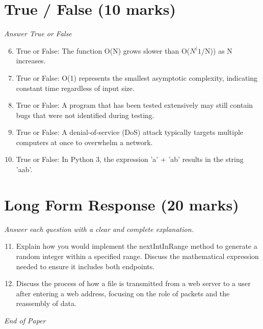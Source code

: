 \documentclass[12pt]{article}
\begin{document}
\section*{True / False (10 marks)}
\textit{Answer True or False}
\begin{enumerate}[label=\arabic*.]
\setcounter{enumi}{5}
\item True or False: The function O(N) grows slower than O($N^(1$/N)) as N increases.
\item True or False: O(1) represents the smallest asymptotic complexity, indicating constant time regardless of input size.
\item True or False: A program that has been tested extensively may still contain bugs that were not identified during testing.
\item True or False: A denial-of-service (DoS) attack typically targets multiple computers at once to overwhelm a network.
\item True or False: In Python 3, the expression 'a' + 'ab' results in the string 'aab'.
\end{enumerate}

\section*{Long Form Response (20 marks)}
\textit{Answer each question with a clear and complete explanation.}
\begin{enumerate}[label=\arabic*.]
\setcounter{enumi}{10}
\item Explain how you would implement the nextIntInRange method to generate a random integer within a specified range. Discuss the mathematical expression needed to ensure it includes both endpoints.
\item Discuss the process of how a file is transmitted from a web server to a user after entering a web address, focusing on the role of packets and the reassembly of data.
\end{enumerate}

\vfill
\noindent\textit{End of Paper}
\end{document}
